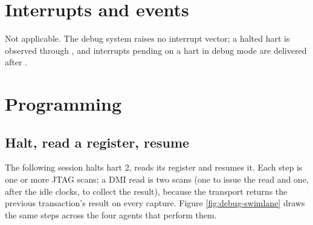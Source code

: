 
\section{Interrupts and events}

Not applicable. The debug system raises no interrupt vector; a halted hart is observed through , and interrupts pending on a hart in debug mode are delivered after .

\section{Programming}

\subsection{Halt, read a register, resume} \label{ss:debug-worked}

The following session halts hart 2, reads its  register and resumes it. Each step is one or more JTAG scans; a DMI read is two scans (one to issue the read and one, after the idle clocks, to collect the result), because the transport returns the previous transaction's result on every capture. Figure \ref{fig:debug-swimlane} draws the same steps across the four agents that perform them.

